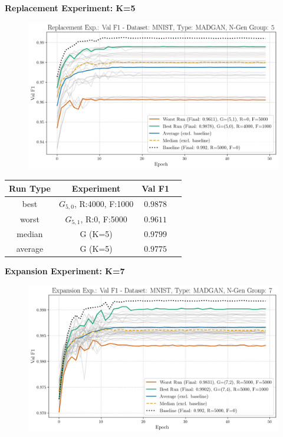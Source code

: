 \noindent\textbf{Replacement Experiment: K=5}
\begin{figure}[htbp]
	\centering
	\includegraphics[width=.85\textwidth]{abb/strat_classifier_performance/MNIST_STRATIFIED_CLASSIFIERS_MADGAN_NEW/replacement_experiments/val_f1_score_MADGAN_MNIST_n_gen_5_all.png}
	\label{fig:app_strat_class_performance_replacement_exp._val_f1_score_5}
\end{figure}
\begin{table}[H]
	\vspace{-1em}
	\centering
	\begin{tabular}{|c|c|c|c|}
		\hline
		Run Type & Experiment & Val F1 \\ \hline
		best & \(G_{5, 0}\), R:4000, F:1000 & $0.9878$\\ \hline
		worst & \(G_{5, 1}\), R:0, F:5000 & $0.9611$\\ \hline
		median & G (K=5) & $0.9799$\\ \hline
		average & G (K=5) & $0.9775$
		\\ \hline
	\end{tabular}
\end{table}
\newpage
\noindent\textbf{Expansion Experiment: K=7}
\begin{figure}[htbp]
	\centering
	\includegraphics[width=.85\textwidth]{abb/strat_classifier_performance/MNIST_STRATIFIED_CLASSIFIERS_MADGAN_NEW/expansion_experiments/val_f1_score_MADGAN_MNIST_n_gen_7_all.png}
	\label{fig:app_strat_class_performance_expansion_exp._val_f1_score_7}
\end{figure}
